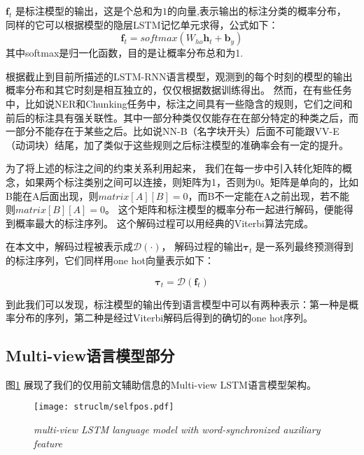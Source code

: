 $\bm{f}_t$ 是标注模型的输出，这是个总和为$1$的向量,表示输出的标注分类的概率分布， 同样的它可以根据模型的隐层LSTM记忆单元求得，公式如下：
	\begin{equation}
    \bm{f}_t = softmax(W_{ho}\bm{h}_{t}+\bm{b}_y)
	\end{equation}	
其中softmax是归一化函数，目的是让概率分布总和为1.




根据截止到目前所描述的LSTM-RNN语言模型，观测到的每个时刻的模型的输出概率分布和其它时刻是相互独立的，仅仅根据数据训练得出。
然而，在有些任务中，比如说NER和Chunking任务中，标注之间具有一些隐含的规则，它们之间和前后的标注具有强关联性。其中一部分种类仅仅能存在在部分特定的种类之后，而一部分不能存在于某些之后。比如说NN-B（名字块开头）后面不可能跟VV-E（动词块）结尾，加了类似于这些规则之后标注模型的准确率会有一定的提升。


为了将上述的标注之间的约束关系利用起来，
我们在每一步中引入转化矩阵的概念，如果两个标注类别之间可以连接，则矩阵为1，否则为0。矩阵是单向的，比如B能在A后面出现，则$matrix[A][B]=0$，而B不一定能在A之前出现，若不能则$matrix[B][A]=0$。
这个矩阵和标注模型的概率分布一起进行解码\cite{Wang2015A}，便能得到概率最大的标注序列。 
这个解码过程可以用经典的Viterbi算法\cite{Andrew1967Viterbi}完成。

在本文中，解码过程被表示成$\mathcal{D}(\cdot)$，
解码过程的输出$\mathbf{\tau}_t$ 是一系列最终预测得到的标注序列，它们同样用one hot向量表示如下：

	\begin{equation}
    \bm{\tau}_t = \mathcal{D}(\bm{f}_t)
	\end{equation}

到此我们可以发现，标注模型的输出传到语言模型中可以有两种表示：第一种是概率分布的序列，第二种是经过Viterbi解码后得到的确切的one hot序列。



\subsection{Multi-view语言模型部分}
\label{sec:psd-ac-conf}
图\ref{fig:selfpos} 展现了我们的仅用前文辅助信息的Multi-view LSTM语言模型架构。

  \begin{figure}[tbhp!]
    \small
    \centering
    \texttt{[image: struclm/selfpos.pdf]}
    \caption{{\it multi-view LSTM  language model with word-synchronized auxiliary feature}}
    \label{fig:selfpos}
  \end{figure}


